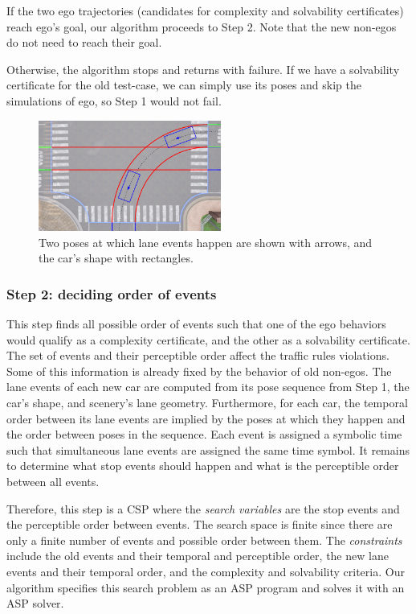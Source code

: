 If the two ego trajectories (candidates for complexity and solvability certificates) reach ego's goal, our algorithm proceeds to Step 2.
%
Note that the new non-egos do not need to reach their goal.

Otherwise, the algorithm stops and returns with failure.
%
If we have a solvability certificate for the old test-case, we can simply use its poses and skip the simulations of ego, so Step 1 would not fail.

\begin{figure}
\centering
\includegraphics[width=60mm]{figures/chapter4/sim-poses-landscape.png}%
\caption{Two poses at which lane events happen are shown with arrows, and the car's shape with rectangles.}
\label{fig:sim-pose}%
\end{figure}


\subsubsection{Step 2: deciding order of events}
This step finds all possible order of events such that one of the ego behaviors would qualify as a complexity certificate, and the other as a solvability certificate.
%
The set of events and their perceptible order affect the traffic rules violations.
%
Some of this information is already fixed by the behavior of old non-egos.
%
The lane events of each new car are computed from its pose sequence from Step 1, the car's shape, and scenery's lane geometry.
%
Furthermore, for each car, the temporal order between its lane events are implied by the poses at which they happen and the order between poses in the sequence.
%
Each event is assigned a symbolic time such that simultaneous lane events are assigned the same time symbol.
%
It remains to determine what stop events should happen and what is the perceptible order between all events.

Therefore, this step is a CSP where the \emph{search variables} are the stop events and the perceptible order between events.
%
The search space is finite since there are only a finite number of events and possible order between them.
%
The \emph{constraints} include the old events and their temporal and perceptible order, the new lane events and their temporal order, and
the complexity and solvability criteria.
%
Our algorithm specifies this search problem as an ASP program and solves it with an ASP solver.



